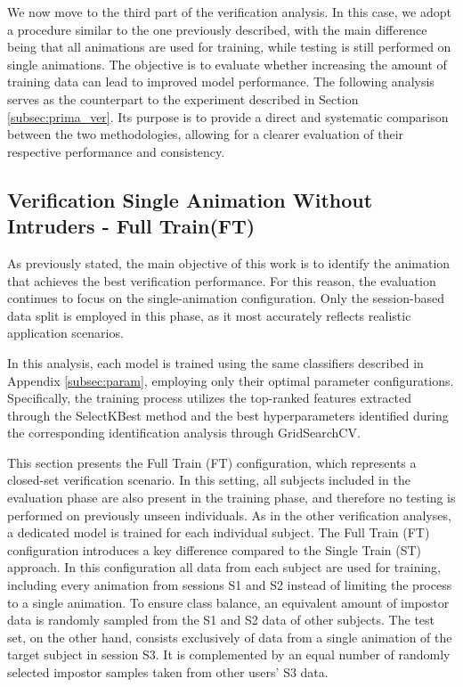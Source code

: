 \documentclass[12pt]{report}
\begin{document}
We now move to the third part of the verification analysis.
In this case, we adopt a procedure similar to the one previously described, with the main difference being that all animations are used for training, while testing is still performed on single animations.
The objective is to evaluate whether increasing the amount of training data can lead to improved model performance.
The following analysis serves as the counterpart to the experiment described in Section \ref{subsec:prima_ver}. 
Its purpose is to provide a direct and systematic comparison between the two methodologies, allowing for a clearer evaluation of their respective performance and consistency.

\subsection{Verification Single Animation Without Intruders - Full Train(FT)}
\label{subsec:vft}

As previously stated, the main objective of this work is to identify the animation that achieves the best verification performance. 
For this reason, the evaluation continues to focus on the single-animation configuration. 
Only the session-based data split is employed in this phase, as it most accurately reflects realistic application scenarios.

In this analysis, each model is trained using the same classifiers described in Appendix \ref{subsec:param}, employing only their optimal parameter configurations. 
Specifically, the training process utilizes the top-ranked features extracted through the SelectKBest method and the best hyperparameters identified during the corresponding identification analysis through GridSearchCV.

This section presents the Full Train (FT) configuration, which represents a closed-set verification scenario. 
In this setting, all subjects included in the evaluation phase are also present in the training phase, and therefore no testing is performed on previously unseen individuals.
As in the other verification analyses, a dedicated model is trained for each individual subject. 
The Full Train (FT) configuration introduces a key difference compared to the Single Train (ST) approach. 
In this configuration all data from each subject are used for training, including every animation from sessions S1 and S2 instead of limiting the process to a single animation.
To ensure class balance, an equivalent amount of impostor data is randomly sampled from the S1 and S2 data of other subjects.
The test set, on the other hand, consists exclusively of data from a single animation of the target subject in session S3. 
It is complemented by an equal number of randomly selected impostor samples taken from other users' S3 data.
\end{document}
